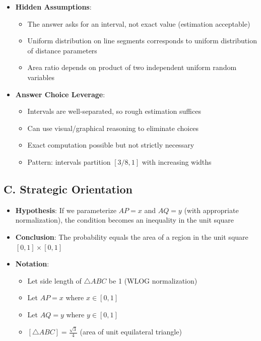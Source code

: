 \documentclass[11pt]{article}
\begin{document}
\begin{problemconfigbox}
\begin{itemize}[leftmargin=*]
    \item \textbf{Hidden Assumptions}: 
    \begin{itemize}
        \item The answer asks for an interval, not exact value (estimation acceptable)
        \item Uniform distribution on line segments corresponds to uniform distribution of distance parameters
        \item Area ratio depends on product of two independent uniform random variables
    \end{itemize}
    
    \item \textbf{Answer Choice Leverage}: 
    \begin{itemize}
        \item Intervals are well-separated, so rough estimation suffices
        \item Can use visual/graphical reasoning to eliminate choices
        \item Exact computation possible but not strictly necessary
        \item Pattern: intervals partition $[3/8, 1]$ with increasing widths
    \end{itemize}
\end{itemize}

\subsection*{C. Strategic Orientation}
\begin{itemize}[leftmargin=*]
    \item \textbf{Hypothesis}: If we parameterize $AP = x$ and $AQ = y$ (with appropriate normalization), the condition becomes an inequality in the unit square
    
    \item \textbf{Conclusion}: The probability equals the area of a region in the unit square $[0,1] \times [0,1]$
    
    \item \textbf{Notation}: 
    \begin{itemize}
        \item Let side length of $\triangle ABC$ be 1 (WLOG normalization)
        \item Let $AP = x$ where $x \in [0,1]$
        \item Let $AQ = y$ where $y \in [0,1]$
        \item $[\triangle ABC] = \frac{\sqrt{3}}{4}$ (area of unit equilateral triangle)
    \end{itemize}
    

\end{itemize}
\end{problemconfigbox}
\end{document}
